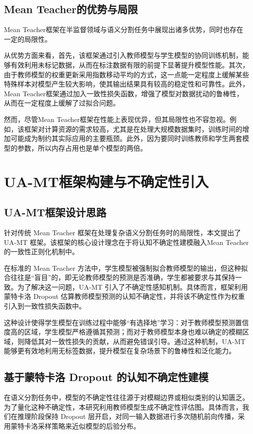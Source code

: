 \documentclass[twoside,openright]{xduugthesis}
\begin{document}
\subsection{Mean Teacher的优势与局限}
Mean Teacher框架在半监督领域与语义分割任务中展现出诸多优势，同时也存在一定的局限性。

从优势方面来看，首先，该框架通过引入教师模型与学生模型的协同训练机制，能够有效利用未标记数据，从而在标注数据有限的前提下显著提升模型性能。其次，由于教师模型的权重更新采用指数移动平均的方式，这一点能一定程度上缓解某些特殊样本对模型产生较大影响，使其输出结果具有较高的稳定性和可靠性。此外，Mean Teacher框架通过加入一致性损失函数，增强了模型对数据扰动的鲁棒性，从而在一定程度上缓解了过拟合问题。

然而，尽管Mean Teacher框架在性能上表现优异，但其局限性也不容忽视。例如，该框架对计算资源的需求较高，尤其是在处理大规模数据集时，训练时间的增加可能成为制约其实际应用的主要瓶颈。此外，因为要同时训练教师和学生两套模型的参数，所以内存占用也是单个模型的两倍。

\section{UA-MT框架构建与不确定性引入}
\subsection{UA-MT框架设计思路}

针对传统 Mean Teacher 框架在处理复杂语义分割任务时的局限性，本文提出了 UA-MT 框架。该框架的核心设计理念在于将认知不确定性建模融入Mean Teacher 的一致性正则化机制中。

在标准的 Mean Teacher 方法中，学生模型被强制拟合教师模型的输出，但这种拟合往往是“盲目”的，即无论教师模型的预测是否准确，学生都被要求与其保持一致。为了解决这一问题，UA-MT 引入了不确定性感知机制。具体而言，框架利用蒙特卡洛 Dropout 估算教师模型预测的认知不确定性，并将该不确定性作为权重引入到一致性损失函数中。

这种设计使得学生模型在训练过程中能够“有选择地”学习：对于教师模型预测置信度高的区域，学生模型严格遵循其预测；而对于教师模型本身也难以确定的模糊区域，则降低其对一致性损失的贡献，从而避免错误引导。通过这种机制，UA-MT 能够更有效地利用无标签数据，提升模型在复杂场景下的鲁棒性和泛化能力。

\subsection{基于蒙特卡洛 Dropout 的认知不确定性建模}
在语义分割任务中，模型的不确定性往往源于对模糊边界或相似类别的认知匮乏。为了量化这种不确定性，本研究利用教师模型生成不确定性评估图。具体而言，我们在推理阶段保持 Dropout 层开启，对同一输入数据进行多次随机前向传播，采用蒙特卡洛采样策略来近似模型的后验分布。
\end{document}
